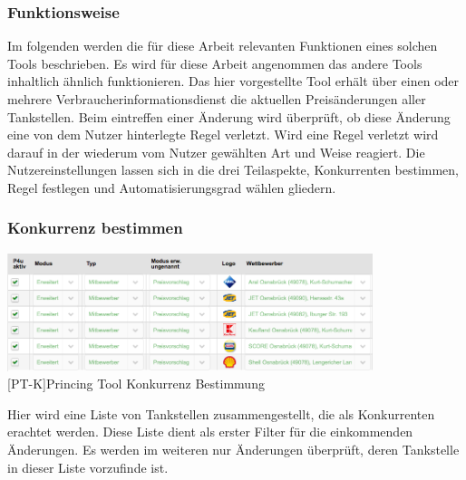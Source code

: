 \documentclass[12pt,a4paper,bibliography=totocnumbered,listof=totocnumbered]{scrartcl}
\begin{document}

\subsubsection{Funktionsweise}
Im folgenden werden die für diese Arbeit relevanten Funktionen eines solchen Tools beschrieben. Es wird für diese Arbeit angenommen das andere Tools inhaltlich ähnlich funktionieren. Das hier vorgestellte Tool erhält über einen oder mehrere Verbraucherinformationsdienst die aktuellen Preisänderungen aller Tankstellen. Beim eintreffen einer Änderung wird überprüft, ob diese Änderung eine von dem Nutzer hinterlegte Regel verletzt. Wird eine Regel verletzt wird darauf in der wiederum vom Nutzer gewählten Art und Weise reagiert. Die Nutzereinstellungen lassen sich in die drei Teilaspekte, Konkurrenten bestimmen, Regel festlegen und Automatisierungsgrad wählen gliedern. 

\subsubsection{Konkurrenz bestimmen}
\begin{center}
	\includegraphics[width=0.8\textwidth]{Bilder/konkurenz.png}\\
	[PT-K]{Princing Tool Konkurrenz Bestimmung}
	\label{fig:PT-K}
\end{center}
Hier wird eine Liste von Tankstellen zusammengestellt, die als Konkurrenten erachtet werden. Diese Liste dient als erster Filter für die einkommenden Änderungen. Es werden im weiteren nur Änderungen überprüft, deren Tankstelle in dieser Liste vorzufinde ist.
\end{document}
